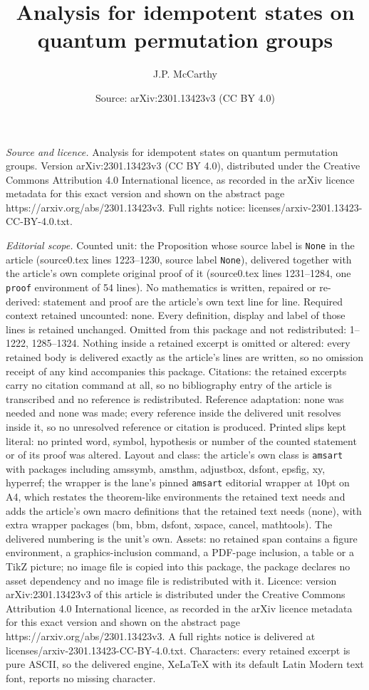 \documentclass[10pt,a4paper]{amsart}
\title[Analysis for idempotent states on quantum permutation groups]{Analysis for idempotent states on quantum permutation groups}
\author{J.P. McCarthy}
\date{Source: arXiv:2301.13423v3 (CC BY 4.0)}
\begin{document}
\maketitle

\noindent\emph{Source and licence.} Analysis for idempotent states on quantum permutation groups. Version arXiv:2301.13423v3 (CC BY 4.0), distributed under the Creative Commons Attribution 4.0 International licence, as recorded in the arXiv licence metadata for this exact version and shown on the abstract page https://arxiv.org/abs/2301.13423v3. Full rights notice: licenses/arxiv-2301.13423-CC-BY-4.0.txt.\par\smallskip

\noindent\textit{Editorial scope.} Counted unit: the Proposition whose source label is \texttt{None} in the article (source0.tex lines 1223--1230, source label \texttt{None}), delivered together with the article's own complete original proof of it (source0.tex lines 1231--1284, one \texttt{proof} environment of 54 lines). No mathematics is written, repaired or re-derived: statement and proof are the article's own text line for line. Required context retained uncounted: none. Every definition, display and label of those lines is retained unchanged. Omitted from this package and not redistributed: 1--1222, 1285--1324. Nothing inside a retained excerpt is omitted or altered: every retained body is delivered exactly as the article's lines are written, so no omission receipt of any kind accompanies this package. Citations: the retained excerpts carry no citation command at all, so no bibliography entry of the article is transcribed and no reference is redistributed. Reference adaptation: none was needed and none was made; every reference inside the delivered unit resolves inside it, so no unresolved reference or citation is produced. Printed slips kept literal: no printed word, symbol, hypothesis or number of the counted statement or of its proof was altered. Layout and class: the article's own class is \texttt{amsart} with packages including amssymb, amsthm, adjustbox, dsfont, epsfig, xy, hyperref; the wrapper is the lane's pinned \texttt{amsart} editorial wrapper at 10pt on A4, which restates the theorem-like environments the retained text needs and adds the article's own macro definitions that the retained text needs (none), with extra wrapper packages (bm, bbm, dsfont, xspace, cancel, mathtools). The delivered numbering is the unit's own. Assets: no retained span contains a figure environment, a graphics-inclusion command, a PDF-page inclusion, a table or a TikZ picture; no image file is copied into this package, the package declares no asset dependency and no image file is redistributed with it. Licence: version arXiv:2301.13423v3 of this article is distributed under the Creative Commons Attribution 4.0 International licence, as recorded in the arXiv licence metadata for this exact version and shown on the abstract page https://arxiv.org/abs/2301.13423v3. A full rights notice is delivered at licenses/arxiv-2301.13423-CC-BY-4.0.txt. Characters: every retained excerpt is pure ASCII, so the delivered engine, XeLaTeX with its default Latin Modern text font, reports no missing character.
\end{document}
